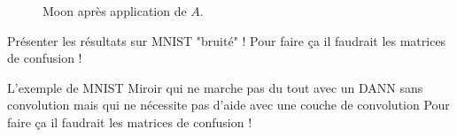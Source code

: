 \begin{figure}[htbp]
\centering
{}
\hfill
{}
\caption{Moon après application de $A$.}
\end{figure}


\FloatBarrier

\TODO Présenter les résultats sur MNIST "bruité" !
\TODO Pour faire ça il faudrait les matrices de confusion !

\TODO L'exemple de MNIST Miroir qui ne marche pas du tout avec un DANN sans
convolution mais qui ne nécessite pas d'aide avec une couche de convolution
\TODO Pour faire ça il faudrait les matrices de confusion !


